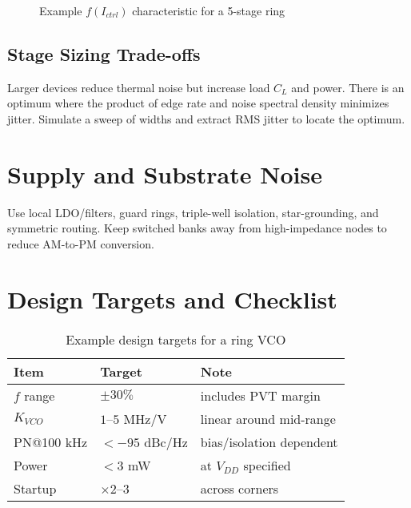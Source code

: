 \begin{figure}[H]
  \centering
  \caption{Example $f(I_{ctrl})$ characteristic for a 5-stage ring}
\end{figure}

\subsection*{Stage Sizing Trade-offs}
Larger devices reduce thermal noise but increase load \(C_L\) and power. There is an optimum where the product of edge rate and noise spectral density minimizes jitter. Simulate a sweep of widths and extract RMS jitter to locate the optimum.

\section{Supply and Substrate Noise}
Use local LDO/filters, guard rings, triple-well isolation, star-grounding, and symmetric routing. Keep switched banks away from high-impedance nodes to reduce AM-to-PM conversion.

\section{Design Targets and Checklist}
\begin{table}[H]
  \centering
  \begin{tabular}{lll}
    \toprule
    Item & Target & Note \\
    \midrule
    $f$ range & $\pm 30\%$ & includes PVT margin \\
    $K_{VCO}$ & $1$–$5$ MHz/V & linear around mid-range \\
    PN@100 kHz & $< -95$ dBc/Hz & bias/isolation dependent \\
    Power & $< 3$ mW & at $V_{DD}$ specified \\
    Startup & $\times 2$–$3$ & across corners \\
    \bottomrule
  \end{tabular}
  \caption{Example design targets for a ring VCO}
\end{table}

